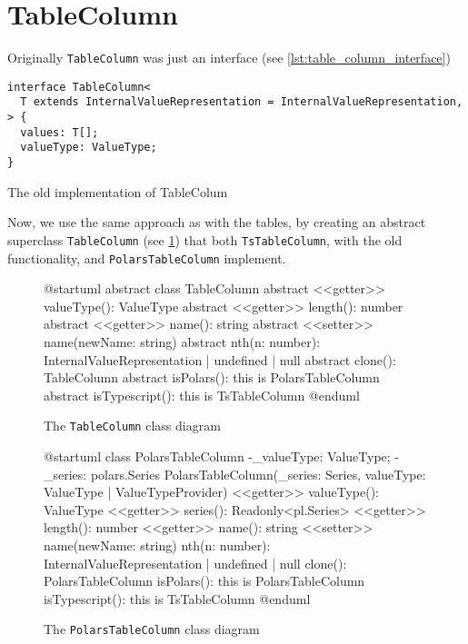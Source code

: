 \section{TableColumn}
Originally \Verb|TableColumn| was just %
an interface (see \ref{lst:table_column_interface})
\begin{listing}
	\begin{verbatim}
interface TableColumn<
  T extends InternalValueRepresentation = InternalValueRepresentation,
> {
  values: T[];
  valueType: ValueType;
}
	\end{verbatim}
	\caption{The old implementation of TableColum}
	\label{lst:table_column_interface}
\end{listing}


Now, we use the same approach as with the tables, by creating an abstract superclass \Verb|TableColumn| (see \ref{fig:tablecolumn_uml}) that both \Verb|TsTableColumn|, with the old functionality, and \Verb|PolarsTableColumn| implement.

\begin{figure}
	\begin{plantuml}
		@startuml
		abstract class TableColumn{
				{abstract} <<getter>> valueType(): ValueType
					{abstract} <<getter>> length(): number
					{abstract} <<getter>> name(): string
					{abstract} <<setter>> name(newName: string)
				{abstract} nth(n: number): InternalValueRepresentation | undefined | null
					{abstract} clone(): TableColumn
					{abstract} isPolars(): this is PolarsTableColumn
					{abstract} isTypescript(): this is TsTableColumn
			}
		@enduml
	\end{plantuml}
	\caption{The \Verb|TableColumn| class diagram}
	\label{fig:tablecolumn_uml}
\end{figure}

\begin{figure}
	\begin{plantuml}
		@startuml
		class PolarsTableColumn {
				-_valueType: ValueType;
				-_series: polars.Series
				PolarsTableColumn(_series: Series, valueType: ValueType | ValueTypeProvider)
				<<getter>> valueType(): ValueType
				<<getter>> series(): Readonly<pl.Series>
				<<getter>> length(): number
				<<getter>> name(): string
				<<setter>> name(newName: string)
				nth(n: number): InternalValueRepresentation | undefined | null
				clone(): PolarsTableColumn
				isPolars(): this is PolarsTableColumn
				isTypescript(): this is TsTableColumn
			}
		@enduml
	\end{plantuml}
	\caption{The \Verb|PolarsTableColumn| class diagram}
	\label{fig:polastablecolumn_uml}
\end{figure}

